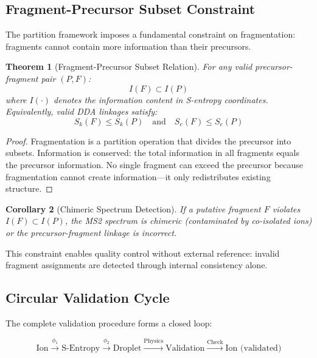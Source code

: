 \documentclass[twocolumn,10pt]{article}
\newtheorem{theorem}{Theorem}[section]
\newtheorem{corollary}[theorem]{Corollary}
\begin{document}
\subsection{Fragment-Precursor Subset Constraint}

The partition framework imposes a fundamental constraint on fragmentation: fragments cannot contain more information than their precursors.

\begin{theorem}[Fragment-Precursor Subset Relation]
For any valid precursor-fragment pair $(P, F)$:
\begin{equation}
I(F) \subset I(P)
\end{equation}
where $I(\cdot)$ denotes the information content in S-entropy coordinates. Equivalently, valid DDA linkages satisfy:
\begin{equation}
S_k(F) \leq S_k(P) \quad \text{and} \quad S_e(F) \leq S_e(P)
\end{equation}
\end{theorem}

\begin{proof}
Fragmentation is a partition operation that divides the precursor into subsets. Information is conserved: the total information in all fragments equals the precursor information. No single fragment can exceed the precursor because fragmentation cannot create information---it only redistributes existing structure.
\end{proof}

\begin{corollary}[Chimeric Spectrum Detection]
If a putative fragment $F$ violates $I(F) \subset I(P)$, the MS2 spectrum is chimeric (contaminated by co-isolated ions) or the precursor-fragment linkage is incorrect.
\end{corollary}

This constraint enables quality control without external reference: invalid fragment assignments are detected through internal consistency alone.

\subsection{Circular Validation Cycle}

The complete validation procedure forms a closed loop:

\begin{equation}
\text{Ion} \xrightarrow{\phi_1} \text{S-Entropy} \xrightarrow{\phi_2} \text{Droplet} \xrightarrow{\text{Physics}} \text{Validation} \xrightarrow{\text{Check}} \text{Ion (validated)}
\end{equation}
\end{document}
